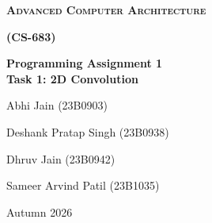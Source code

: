 \documentclass[11pt]{article}
\newcommand{\StudentOne}{Abhi Jain (23B0903)}
\newcommand{\StudentTwo}{Deshank Pratap Singh (23B0938)}
\newcommand{\StudentThree}{Dhruv Jain (23B0942)}
\newcommand{\StudentFour}{Sameer Arvind Patil (23B1035)}
\begin{document}
\begin{titlepage}
    \centering
    {\scshape\bfseries\Huge Advanced Computer Architecture\par}
    \vspace{0.2cm}
    {\scshape\bfseries\Huge (CS-683)\par}
    \vspace{0.8cm}
    {\huge \textbf{Programming Assignment 1 \\
    Task 1: 2D Convolution}\par}
    \vspace{1cm}

    {\Large \StudentOne\par}
    {\Large \StudentTwo\par}
    {\Large \StudentThree\par}
    {\Large \StudentFour\par}
    \vspace{0.5cm}
    
    \vfill
    {\large Autumn 2026\par}
  \end{titlepage}
  \tableofcontents


  \newpage

  \newpage


  \newpage


  \newpage


  \newpage
\end{document}
